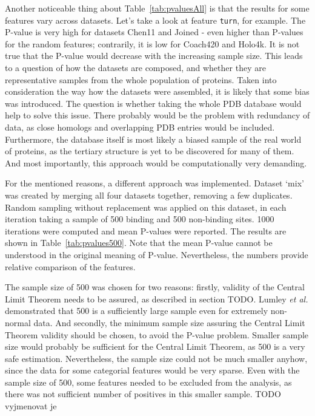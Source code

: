 Another noticeable thing about Table~\ref{tab:pvaluesAll} is that the results for some features vary across datasets. Let's take a look at feature \texttt{turn}, for example. The P-value is very high for datasets Chen11 and Joined - even higher than P-values for the random features; contrarily, it is low for Coach420 and Holo4k. It is not true that the P-value would decrease with the increasing sample size. This leads to a question of how the datasets are composed, and whether they are representative samples from the whole population of proteins. Taken into consideration the way how the datasets were assembled, it is likely that some bias was introduced. The question is whether taking the whole PDB database would help to solve this issue. There probably would be the problem with redundancy of data, as close homologs and overlapping PDB entries would be included. Furthermore, the database itself is most likely a biased sample of the real world of proteins, as the tertiary structure is yet to be discovered for many of them. And most importantly, this approach would be computationally very demanding.

For the mentioned reasons, a different approach was implemented. Dataset `mix' was created by merging all four datasets together, removing a few duplicates. Random sampling without replacement was applied on this dataset, in each iteration taking a sample of 500 binding and 500 non-binding sites. 1000 iterations were computed and mean P-values were reported. The results are shown in Table~\ref{tab:pvalues500}. Note that the mean P-value cannot be understood in the original meaning of P-value. Nevertheless, the numbers provide relative comparison of the features.

The sample size of 500 was chosen for two reasons: firstly,  validity of the Central Limit Theorem needs to be assured, as described in section TODO. Lumley \textit{et al.} \cite{lumley} demonstrated that 500 is a sufficiently large sample even for extremely non-normal data. And secondly, the minimum sample size assuring the Central Limit Theorem validity should be chosen, to avoid the P-value problem. Smaller sample size would probably be sufficient for the Central Limit Theorem, as 500 is a very safe estimation. Nevertheless, the sample size could not be much smaller anyhow, since the data for some categorial features would be very sparse. Even with the sample size of 500, some features needed to be excluded from the analysis, as there was not sufficient number of positives in this smaller sample. TODO vyjmenovat je

